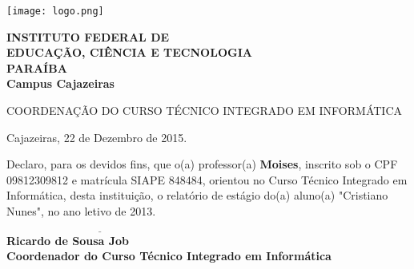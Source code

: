 


\hspace{1.4cm}
\begin{minipage}{.19\textwidth}
    \texttt{[image: logo.png]}
\end{minipage}
\begin{minipage}[t]{\textwidth}
    \vspace{.001cm}
    {\bf
        {\selectfont
            INSTITUTO FEDERAL DE\\
            EDUCAÇÃO, CIÊNCIA E TECNOLOGIA\\
            {\color{green}
                \uppercase{Paraíba}\\
                Campus Cajazeiras
            }
        }
    }
\end{minipage}

{\bf {\selectfont
    \begin{center} {\selectfont
		COORDENAÇÃO DO \uppercase{Curso Técnico Integrado em Informática}
    } \end{center}
} }

\vspace{1.5cm}

\begin{flushright} Cajazeiras, 22 de Dezembro de 2015. \end{flushright}

\vspace{2cm}

Declaro, para os devidos fins, que o(a) professor(a) {\bf Moises}, inscrito sob o CPF 09812309812 e matrícula SIAPE 848484, orientou no Curso Técnico Integrado em Informática, desta instituição, o relatório de estágio do(a) aluno(a) "Cristiano Nunes", no ano letivo de 2013.

\vspace{2cm}

{\bf
	\indent $\underline{\hspace{7cm}}$\\
	\indent Ricardo de Sousa Job\\
	\indent Coordenador do Curso Técnico Integrado em Informática\\
}


